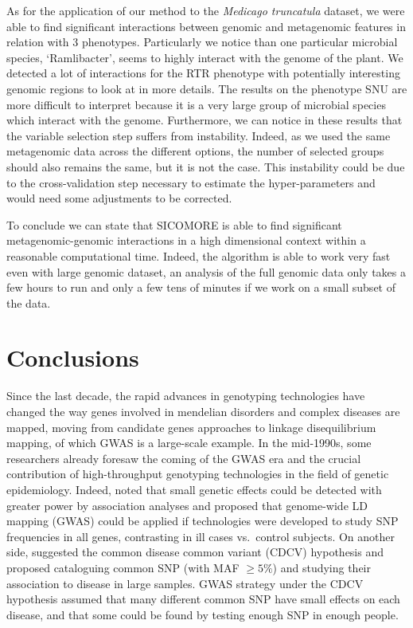 \documentclass[]{book}
\begin{document}
As for the application of our method to the \emph{Medicago truncatula}
dataset, we were able to find significant interactions between genomic
and metagenomic features in relation with 3 phenotypes. Particularly we
notice than one particular microbial species, `Ramlibacter', seems to
highly interact with the genome of the plant. We detected a lot of
interactions for the RTR phenotype with potentially interesting genomic
regions to look at in more details. The results on the phenotype SNU are
more difficult to interpret because it is a very large group of
microbial species which interact with the genome. Furthermore, we can
notice in these results that the variable selection step suffers from
instability. Indeed, as we used the same metagenomic data across the
different options, the number of selected groups should also remains the
same, but it is not the case. This instability could be due to the
cross-validation step necessary to estimate the hyper-parameters and
would need some adjustments to be corrected.

To conclude we can state that SICOMORE is able to find significant
metagenomic-genomic interactions in a high dimensional context within a
reasonable computational time. Indeed, the algorithm is able to work
very fast even with large genomic dataset, an analysis of the full
genomic data only takes a few hours to run and only a few tens of
minutes if we work on a small subset of the data.

\hypertarget{conclusions}{%
\chapter*{Conclusions}\label{conclusions}}

Since the last decade, the rapid advances in genotyping technologies
have changed the way genes involved in mendelian disorders and complex
diseases are mapped, moving from candidate genes approaches to linkage
disequilibrium mapping, of which GWAS is a large-scale example. In the
mid-1990s, some researchers already foresaw the coming of the GWAS era
and the crucial contribution of high-throughput genotyping technologies
in the field of genetic epidemiology. Indeed, \citep{risch1996future} noted
that small genetic effects could be detected with greater power by
association analyses and proposed that genome-wide LD mapping (GWAS)
could be applied if technologies were developed to study SNP frequencies
in all genes, contrasting in ill cases vs.~control subjects. On another
side, \citep{lander1996new} suggested the common disease common variant
(CDCV) hypothesis and proposed cataloguing common SNP (with MAF
\(\geq 5\%\)) and studying their association to disease in large samples.
GWAS strategy under the CDCV hypothesis assumed that many different
common SNP have small effects on each disease, and that some could be
found by testing enough SNP in enough people.
\end{document}

